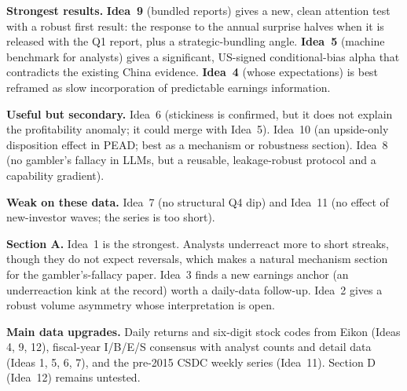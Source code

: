 \documentclass[10pt]{article}
\begin{document}
\textbf{Strongest results.} \textbf{Idea~9} (bundled reports) gives a new, clean attention test with a robust first
result: the response to the annual surprise halves when it is released with the Q1 report, plus a strategic-bundling
angle. \textbf{Idea~5} (machine benchmark for analysts) gives a significant, US-signed conditional-bias alpha that
contradicts the existing China evidence. \textbf{Idea~4} (whose expectations) is best reframed as slow incorporation
of predictable earnings information.

\textbf{Useful but secondary.} Idea~6 (stickiness is confirmed, but it does not explain the profitability anomaly;
it could merge with Idea~5). Idea~10 (an upside-only disposition effect in PEAD; best as a mechanism or robustness
section). Idea~8 (no gambler's fallacy in LLMs, but a reusable, leakage-robust protocol and a capability gradient).

\textbf{Weak on these data.} Idea~7 (no structural Q4 dip) and Idea~11 (no effect of new-investor waves; the series
is too short).

\textbf{Section A.} Idea~1 is the strongest. Analysts underreact more to short streaks, though they do not expect
reversals, which makes a natural mechanism section for the gambler's-fallacy paper. Idea~3 finds a new earnings
anchor (an underreaction kink at the record) worth a daily-data follow-up. Idea~2 gives a robust volume asymmetry
whose interpretation is open.

\textbf{Main data upgrades.} Daily returns and six-digit stock codes from Eikon (Ideas 4, 9, 12), fiscal-year I/B/E/S
consensus with analyst counts and detail data (Ideas 1, 5, 6, 7), and the pre-2015 CSDC weekly series (Idea~11).
Section D (Idea~12) remains untested.
\end{document}
